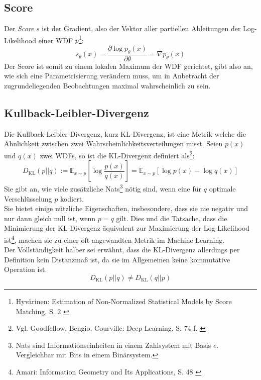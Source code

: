 \subsection{Score}

Der \textit{Score} $s$ ist der Gradient, also der Vektor aller partiellen Ableitungen der Log-Likelihood einer \ac{WDF} $p$\footnote{
    Hyvärinen: Estimation of Non-Normalized Statistical Models by Score Matching, S. 2
    \cite{JMLR:v6:hyvarinen05a}
}: 
\begin{equation}
    s_\theta(x) = \frac{\partial \log p_\theta(x)}{\partial \theta} 
    = \nabla p_\theta(x)
\end{equation}
Der Score ist somit zu einem lokalen Maximum der \ac{WDF} gerichtet, gibt also an, wie sich eine Parametrisierung verändern muss, um in Anbetracht der zugrundeliegenden Beobachtungen maximal wahrscheinlich zu sein.

\subsection{Kullback-Leibler-Divergenz}

Die Kullback-Leibler-Divergenz, kurz KL-Divergenz, ist eine Metrik welche die Ähnlichkeit zwischen zwei Wahrscheinlichkeitsverteilungen misst. Seien $p(x)$ und $q(x)$ zwei \ac{WDF}s, so ist die KL-Divergenz definiert als\footnote{
    Vgl. Goodfellow, Bengio, Courville: Deep Learning, S. 74 f.
    \cite{Goodfellow-et-al-2016}
}:
\begin{equation}
    D_\text{KL}(p||q) 
    := \mathbb{E}_{x \sim p} \left [
    \log \frac{p(x)} {q(x)}
    \right ]
    = \mathbb{E}_{x \sim p} \left [ 
        \log p(x) - \log q(x)
        \right ]
\end{equation}
Sie gibt an, wie viele zusätzliche Nats\footnote{
    Nats sind Informationseinheiten in einem Zahlsystem mit Basis $e$. Vergleichbar mit Bits in einem Binärsystem. 
} nötig sind, wenn eine für $q$ optimale Verschlüsselung $p$ kodiert. \\
Sie bietet einige nützliche Eigenschaften, insbesondere, dass sie nie negativ und nur dann gleich null ist, wenn $p = q$ gilt. Dies und die Tatsache, dass die Minimierung der KL-Divergenz äquivalent zur Maximierung der Log-Likelihood ist\footnote{
    Amari: Information Geometry and Its Applications, S. 48
    \cite{10.5555/3019383}
}, machen sie zu einer oft angewandten Metrik im Machine Learning. \\
Der Vollständigkeit halber sei erwähnt, dass die KL-Divergenz allerdings per Definition kein Distanzmaß ist, da sie im Allgemeinen keine kommutative Operation ist.  
\begin{equation}
    D_\text{KL}(p||q) \ne D_\text{KL}(q||p) 
\end{equation}


